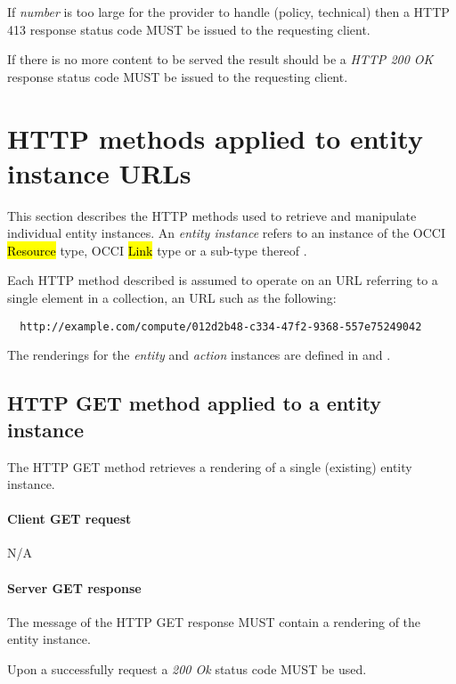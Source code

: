 \documentclass[10pt,a4paper]{article}
\begin{document}

If {\em number} is too large for the provider to handle (policy, technical) then a HTTP 413 response status code MUST be issued to the requesting client.

If there is no more content to be served the result should be a \emph{HTTP 200 OK} response status code MUST be issued to the requesting client.

\section{HTTP methods applied to entity instance URLs}


This section describes the HTTP methods used to retrieve and manipulate
individual entity instances. An {\em entity instance} refers to an instance
of the OCCI \hl{Resource} type, OCCI \hl{Link} type or a sub-type thereof
\cite{occi:core}.

Each HTTP method described is assumed to operate
on an URL referring to a single element in a collection, an URL such as the
following:
\begin{verbatim}
  http://example.com/compute/012d2b48-c334-47f2-9368-557e75249042
\end{verbatim}

The renderings for the {\em entity} and {\em action} instances are defined in \cite{occi:text} and \cite{occi:json}.

\subsection{HTTP GET method applied to a entity instance}
The HTTP GET method retrieves a rendering of a single (existing) entity instance.

\paragraph{Client GET request}
N/A

\paragraph{Server GET response}
The message of the HTTP GET response MUST contain a rendering of the entity instance.

Upon a successfully request a \emph{200 Ok} status code MUST be used.
\end{document}
